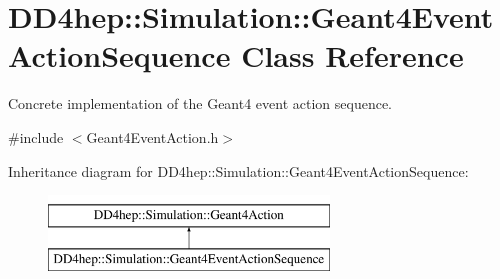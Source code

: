 \hypertarget{class_d_d4hep_1_1_simulation_1_1_geant4_event_action_sequence}{}\section{D\+D4hep\+:\+:Simulation\+:\+:Geant4\+Event\+Action\+Sequence Class Reference}
\label{class_d_d4hep_1_1_simulation_1_1_geant4_event_action_sequence}


Concrete implementation of the Geant4 event action sequence.  




{\ttfamily \#include $<$Geant4\+Event\+Action.\+h$>$}

Inheritance diagram for D\+D4hep\+:\+:Simulation\+:\+:Geant4\+Event\+Action\+Sequence\+:\begin{figure}[H]
\begin{center}
\leavevmode
\includegraphics[height=2.000000cm]{class_d_d4hep_1_1_simulation_1_1_geant4_event_action_sequence}
\end{center}
\end{figure}
